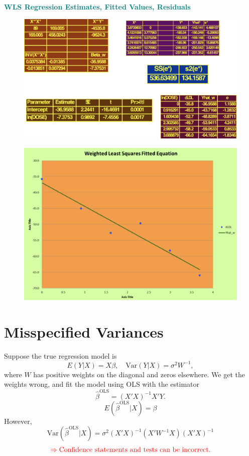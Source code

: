 \documentclass[14pt]{extarticle}
\begin{document}
\textbf{\textcolor{teal}{WLS Regression Estimates, Fitted Values, Residuals}}
\begin{figure}[H]
    \centering
    \includegraphics[width=1\textwidth]{fig6.png}
\end{figure}   
\begin{figure}[H]
    \centering
    \includegraphics[width=1\textwidth]{fig7.png}
\end{figure}   
\section*{Misspecified Variances}

Suppose the true regression model is
\[
E(Y | X) = X \beta, \quad \text{Var}(Y | X) = \sigma^2 W^{-1},
\]
\noindent
where \( W \) has positive weights on the diagonal and zeros elsewhere. We get the weights wrong, and fit the model using OLS with the estimator
\[
\hat{\beta}^{\text{OLS}} = (X'X)^{-1} X'Y.
\]
\[
E(\hat{\beta}^{\text{OLS}} | X) = \beta
\]
However,
\[
\text{Var}(\hat{\beta}^{\text{OLS}} | X) = \sigma^2 (X'X)^{-1} (X'W^{-1}X) (X'X)^{-1}
\]
\quad \quad \quad \quad \quad \quad \quad \quad \quad \quad \quad \quad \quad \quad \quad \quad \quad \textcolor{green}{}
\[
\textcolor{red}{\Rightarrow \text{Confidence statements and tests can be incorrect.}}
\]
\end{document}
